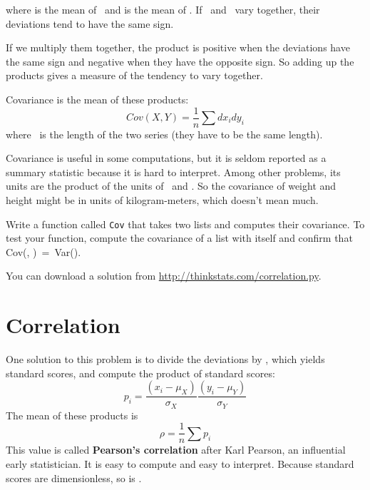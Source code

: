 \documentclass[12pt]{book}
\begin{document}


where \mymu {} is the mean of \X~and \mymu {} is the mean of \Y.
If \X~and \Y~vary together, their deviations tend to have the same
sign.

If we multiply them together, the product is positive when the
deviations have the same sign and negative when they have the opposite
sign.  So adding up the products gives a measure of the tendency to
vary together.

Covariance is the mean of these products:
%
\[ Cov(X,Y) = \frac{1}{n} \sum dx_i dy_i \]
%
where \n~is the length of the two series (they have to be the same
length).

Covariance is useful in some computations, but
it is seldom reported as a summary statistic because it is hard to
interpret.  Among other problems, its units are the product of the
units of \X~and \Y.  So the covariance of weight and height might be
in units of kilogram-meters, which doesn't mean much.

\begin{exercise}
Write a function called {\tt Cov} that takes two lists
and computes their covariance.  To test your function, compute
the covariance of a list with itself and confirm that
Cov(\X, \X)~=~Var(\X).

You can download a solution from
\url{http://thinkstats.com/correlation.py}.

\end{exercise}


\section{Correlation}

One solution to this problem is to divide the deviations by \mysigma,
which yields standard scores, and compute the product of standard scores:
%
\[ p_i = \frac{(x_i - \mu_X)}{\sigma_X} \frac{(y_i - \mu_Y)}{\sigma_Y} \]
%
The mean of these products is
%
\[ \rho = \frac{1}{n} \sum p_i \]
%
This value is called {\bf Pearson's correlation} after Karl Pearson,
an influential early statistician.  It is easy to compute and easy to
interpret.  Because standard scores are dimensionless, so is \myrho.
\end{document}
